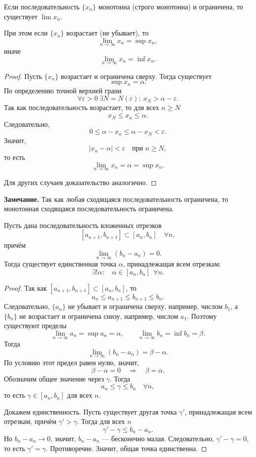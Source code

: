 \begin{theorem}
Если последовательность \(\{x_n\}\) монотонна (строго монотонна) и ограничена,
то существует \(\lim x_n\).

При этом если \(\{x_n\}\) возрастает (не убывает), то
\[
\lim_{n\to\infty} x_n = \sup x_n,
\]
иначе
\[
\lim_{n\to\infty} x_n = \inf x_n.
\]
\end{theorem}

\begin{proof}
Пусть \(\{x_n\}\) возрастает и ограничена сверху. Тогда существует
\[
\sup x_n = \alpha.
\]
По определению точной верхней грани
\[
\forall \varepsilon>0\ \exists N=N(\varepsilon):\ x_N > \alpha-\varepsilon.
\]
Так как последовательность возрастает, то для всех \(n\ge N\)
\[
x_N \le x_n \le \alpha.
\]
Следовательно,
\[
0 \le \alpha -x_n \le \alpha - x_N < \varepsilon.
\]
Значит,
\[
|x_n-\alpha|<\varepsilon \quad \text{при } n\ge N,
\]
то есть
\[
\lim_{n\to\infty} x_n = \alpha = \sup x_n.
\]

Для других случаев доказательство аналогично.
\end{proof}

\noindent\textbf{Замечание.} Так как любая сходящаяся последовательность
ограничена, то монотонная сходящаяся последовательность ограничена.


\begin{theorem}[Кантора]
Пусть дана последовательность вложенных отрезков
\[
[a_{n+1}, b_{n+1}] \subset [a_n, b_n] \quad \forall n,
\]
причём
\[
\lim_{n\to\infty}(b_n-a_n)=0.
\]
Тогда существует единственная точка \(\alpha\), принадлежащая всем отрезкам:
\[
\exists! \alpha:\quad \alpha \in [a_n,b_n]\ \ \forall n.
\]
\end{theorem}

\begin{proof}
Так как \([a_{n+1},b_{n+1}]\subset [a_n,b_n]\), то
\[
a_n \le a_{n+1} \le b_{n+1} \le b_n.
\]
Следовательно, \(\{a_n\}\) не убывает и ограничена сверху, например, числом
\(b_1\), а \(\{b_n\}\) не возрастает и ограничена снизу, например, числом
\(a_1\). Поэтому существуют пределы
\[
\lim_{n\to\infty} a_n = \sup a_n = \alpha,\qquad
\lim_{n\to\infty} b_n = \inf b_n = \beta.
\]
Тогда
\[
\lim_{n\to\infty}(b_n-a_n)=\beta-\alpha.
\]
По условию этот предел равен нулю, значит,
\[
\beta-\alpha=0 \quad\Rightarrow\quad \beta=\alpha.
\]
Обозначим общее значение через \(\gamma\). Тогда
\[
a_n \le \gamma \le b_n \quad \forall n,
\]
то есть \(\gamma\in[a_n,b_n]\) для всех \(n\).

Докажем единственность. Пусть существует другая точка \(\gamma'\), принадлежащая
всем отрезкам, причём \(\gamma'>\gamma\). Тогда для всех \(n\)
\[
\gamma'-\gamma \le b_n-a_n.
\]
Но \(b_n-a_n\to 0\), значит, \(b_n-a_n\) — бесконечно малая. Следовательно,
\(\gamma'-\gamma=0\), то есть \(\gamma'=\gamma\). Противоречие. Значит, общая
точка единственна.
\end{proof}

